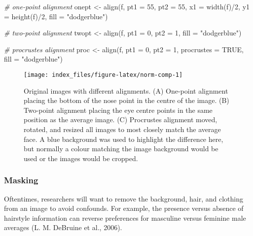 \documentclass[
  doc,floatsintext]{apa6}
\newenvironment{Shaded}{\begin{snugshade}}{\end{snugshade}}
\newcommand{\AttributeTok}[1]{\textcolor[rgb]{0.77,0.63,0.00}{#1}}
\newcommand{\CommentTok}[1]{\textcolor[rgb]{0.56,0.35,0.01}{\textit{#1}}}
\newcommand{\ConstantTok}[1]{\textcolor[rgb]{0.00,0.00,0.00}{#1}}
\newcommand{\DecValTok}[1]{\textcolor[rgb]{0.00,0.00,0.81}{#1}}
\newcommand{\FunctionTok}[1]{\textcolor[rgb]{0.00,0.00,0.00}{#1}}
\newcommand{\NormalTok}[1]{#1}
\newcommand{\OtherTok}[1]{\textcolor[rgb]{0.56,0.35,0.01}{#1}}
\newcommand{\SpecialCharTok}[1]{\textcolor[rgb]{0.00,0.00,0.00}{#1}}
\newcommand{\StringTok}[1]{\textcolor[rgb]{0.31,0.60,0.02}{#1}}
\begin{document}
\begin{Shaded}
\begin{Highlighting}[]
\CommentTok{\# one{-}point alignment}
\NormalTok{onept }\OtherTok{\textless{}{-}} \FunctionTok{align}\NormalTok{(f, }\AttributeTok{pt1 =} \DecValTok{55}\NormalTok{, }\AttributeTok{pt2 =} \DecValTok{55}\NormalTok{,}
               \AttributeTok{x1 =} \FunctionTok{width}\NormalTok{(f)}\SpecialCharTok{/}\DecValTok{2}\NormalTok{, }\AttributeTok{y1 =} \FunctionTok{height}\NormalTok{(f)}\SpecialCharTok{/}\DecValTok{2}\NormalTok{,}
               \AttributeTok{fill =} \StringTok{"dodgerblue"}\NormalTok{)}

\CommentTok{\# two{-}point alignment}
\NormalTok{twopt }\OtherTok{\textless{}{-}} \FunctionTok{align}\NormalTok{(f, }\AttributeTok{pt1 =} \DecValTok{0}\NormalTok{, }\AttributeTok{pt2 =} \DecValTok{1}\NormalTok{, }\AttributeTok{fill =} \StringTok{"dodgerblue"}\NormalTok{)}

\CommentTok{\# procrustes alignment}
\NormalTok{proc }\OtherTok{\textless{}{-}} \FunctionTok{align}\NormalTok{(f, }\AttributeTok{pt1 =} \DecValTok{0}\NormalTok{, }\AttributeTok{pt2 =} \DecValTok{1}\NormalTok{, }\AttributeTok{procrustes =} \ConstantTok{TRUE}\NormalTok{, }\AttributeTok{fill =} \StringTok{"dodgerblue"}\NormalTok{)}
\end{Highlighting}
\end{Shaded}

\begin{figure}
\texttt{[image: index\_files/figure-latex/norm-comp-1]} \caption{Original images with different alignments. (A) One-point alignment placing the bottom of the nose point in the centre of the image. (B) Two-point alignment placing the eye centre points in the same position as the average image. (C) Procrustes alignment moved, rotated, and resized all images to most closely match the average face. A blue background was used to highlight the difference here, but normally a colour matching the image background would be used or the images would be cropped.}\label{fig:norm-comp}
\end{figure}

\hypertarget{masking}{%
\subsubsection{Masking}\label{masking}}

Oftentimes, researchers will want to remove the background, hair, and clothing from an image to avoid confounds. For example, the presence versus absence of hairstyle information can reverse preferences for masculine versus feminine male averages (L. M. DeBruine et al., 2006).
\end{document}
